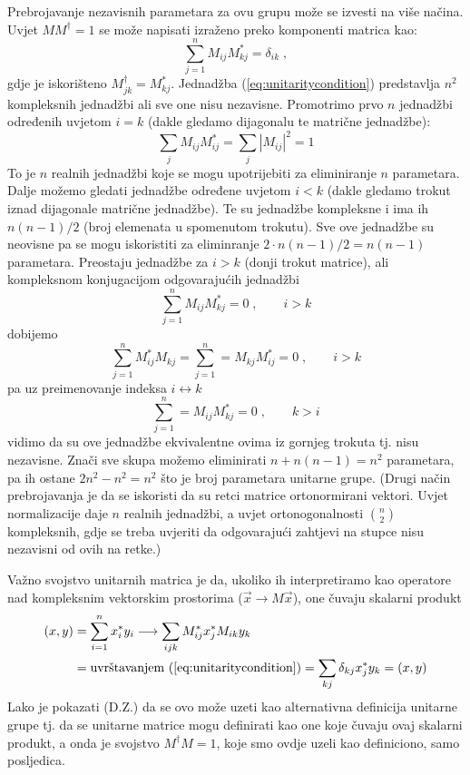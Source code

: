 \begin{enumerate}
Prebrojavanje nezavisnih parametara za ovu grupu može se izvesti
na više načina. Uvjet $M M^\dagger = 1$ se može napisati izraženo
preko komponenti matrica kao:
\begin{equation}
\sum_{j=1}^{n} M_{ij} M_{kj}^* = \delta_{ik}\;,
\label{eq:unitaritycondition}
\end{equation}
gdje je iskorišteno $M^{\dagger}_{jk} = M^{*}_{kj}$.
Jednadžba (\ref{eq:unitaritycondition}) predstavlja $n^2$ kompleksnih
jednadžbi ali sve one nisu nezavisne. Promotrimo prvo $n$ jednadžbi
određenih uvjetom $i=k$ (dakle gledamo dijagonalu te matrične jednadžbe):
\begin{equation}
 \sum_j M_{ij} M^{*}_{ij} = \sum_j |M_{ij}|^2 = 1
\label{eq:diagonalcondition}
\end{equation}
To je $n$ realnih jednadžbi koje se mogu upotrijebiti za eliminiranje
$n$ parametara. Dalje možemo gledati jednadžbe određene uvjetom
$i < k$ (dakle gledamo trokut iznad dijagonale matrične jednadžbe).
Te su jednadžbe kompleksne i ima ih $n(n-1)/2$ (broj elemenata u 
spomenutom trokutu). Sve ove jednadžbe su neovisne pa se mogu
iskoristiti za eliminranje $2 \cdot n(n-1)/2 = n(n-1)$ parametara.
Preostaju jednadžbe za $i >k$ (donji trokut matrice), ali kompleksnom
konjugacijom odgovarajućih jednadžbi
\begin{equation}
\sum_{j=1}^{n} M_{ij} M_{kj}^* = 0\;, \qquad i>k
\end{equation}
dobijemo
\begin{equation}
\sum_{j=1}^{n} M_{ij}^* M_{kj}  = \sum_{j=1}^{n} = M_{kj} M_{ij}^* = 0\;, \qquad i>k
\end{equation}
pa uz preimenovanje indeksa $i \leftrightarrow k$
\begin{equation}
\sum_{j=1}^{n} =  M_{ij} M_{kj}^* = 0\;, \qquad k>i
\end{equation}
vidimo da su ove jednadžbe ekvivalentne ovima iz gornjeg trokuta tj. nisu
nezavisne.
Znači sve skupa možemo eliminirati $n + n(n-1) = n^2$ parametara, pa ih
ostane $2n^2 - n^2 = n^2$ što je broj parametara unitarne grupe.
(Drugi način prebrojavanja je da se iskoristi da su retci matrice ortonormirani
vektori. Uvjet normalizacije daje $n$ realnih jednadžbi, a uvjet
ortonogonalnosti $\binom{n}{2}$ kompleksnih, gdje se treba uvjeriti
da odgovarajući zahtjevi na stupce nisu nezavisni od ovih na retke.)

Važno svojstvo unitarnih matrica je da, ukoliko ih interpretiramo kao
operatore nad kompleksnim vektorskim prostorima ($\vec{x} \to M\vec{x}$), 
one čuvaju skalarni produkt
\begin{align}
  (x, y)& = \sum_{i=1}^n x_{i}^* y_i  \longrightarrow
   \sum_{ijk} M^{*}_{ij}x^{*}_j M_{ik}y_{k} \nonumber \\
 & = \text{uvrštavanjem
(\ref{eq:unitaritycondition})} = \sum_{kj} \delta_{kj} x^{*}_j y_k = (x, y)
\label{eq:productinvariance}
\end{align}
Lako je pokazati (D.Z.) da se ovo može uzeti kao alternativna definicija
unitarne grupe tj. da se unitarne matrice mogu definirati kao one koje
čuvaju ovaj skalarni produkt, a onda je svojstvo $M^{\dagger} M = 1$, koje
smo ovdje uzeli kao definiciono, samo posljedica.


\end{enumerate}
